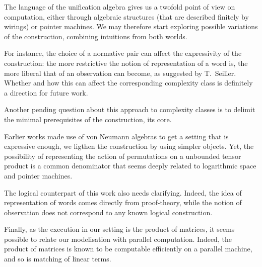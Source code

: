 The language of the unification algebra gives us a twofold point of view on computation, either through algebraic structures (that are described finitely by wirings) or pointer machines.
We may therefore start exploring possible variations of the construction, combining intuitions from both worlds.


\smallskip
For instance, the choice of a normative pair can affect the expressivity of the construction:
the more restrictive the notion of representation of a word is, the more liberal that of an observation can become, as suggested by T.~Seiller.
Whether and how this can affect the corresponding complexity class is definitely a direction for future work.




\smallskip
Another pending question about this approach to complexity classes is to delimit the minimal prerequisites of the construction, its core.

Earlier works \cite{girard_normativity_2012,aubert_characterizing_2012,seiller_logarithmic_2013} made use of von Neumann algebras to get a setting that is expressive enough, we ligthen the construction by using simpler objects.
Yet, the possibility of representing the action of permutations on a unbounded tensor product is a common denominator that seems deeply related to logarithmic space and pointer machines.

\smallskip
The logical counterpart of this work also needs clarifying.
Indeed, the idea of representation of words comes directly from proof-theory, while the notion of observation does not correspond to any known logical construction.

\smallskip
Finally, as the execution in our setting is the product of matrices, it seems possible to relate our modelisation with parallel computation. Indeed, the product of matrices is known to be computable efficiently on a parallel machine, and so is matching of linear terms.
